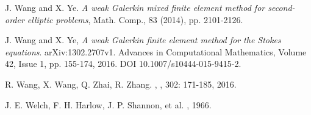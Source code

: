 \documentclass[final,leqno]{siamltex704}
\begin{document}
\begin{thebibliography}{99}
{\sc J. Wang and X. Ye}. {\em A weak Galerkin mixed finite element
method for second-order elliptic problems}, Math. Comp., 83 (2014), pp. 2101-2126.

 {\sc J. Wang and X. Ye}, {\em A weak
Galerkin finite element method for the Stokes equations}.
arXiv:1302.2707v1. Advances in Computational Mathematics,
 Volume 42, Issue 1, pp. 155-174, 2016. DOI 10.1007/s10444-015-9415-2.

R. Wang, X. Wang, Q. Zhai, R. Zhang.
,
, 302: 171-185, 2016.

J. E. Welch, F. H. Harlow, J. P. Shannon, et al.
, 1966.


\end{thebibliography}
\end{document}
